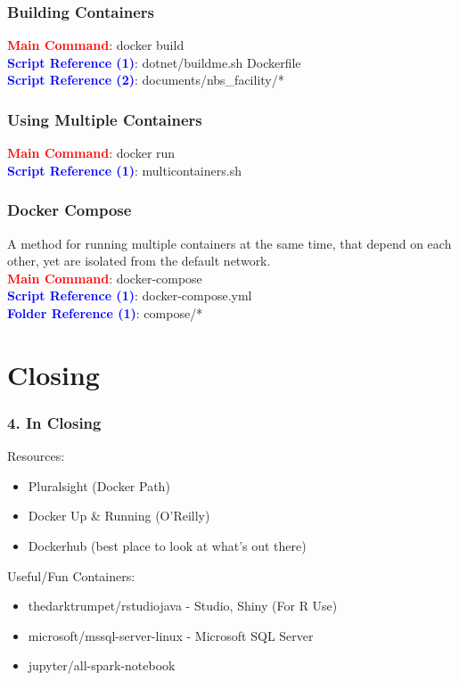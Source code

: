 \documentclass{beamer}
\begin{document}
\begin{frame}
    \frametitle{Building Containers}
    \textcolor{red}{\textbf{Main Command}}: docker build \\
    \textcolor{blue}{\textbf{Script Reference (1)}}: dotnet/buildme.sh Dockerfile \\
    \textcolor{blue}{\textbf{Script Reference (2)}}: documents/nbs\_facility/*
\end{frame}

\begin{frame}
    \frametitle{Using Multiple Containers}
    \textcolor{red}{\textbf{Main Command}}: docker run \\
    \textcolor{blue}{\textbf{Script Reference (1)}}: multicontainers.sh
\end{frame}

\begin{frame}
    \frametitle{Docker Compose}
    A method for running multiple containers at the same time, that depend on each other, yet are isolated from the default network. \\
    \textcolor{red}{\textbf{Main Command}}: docker-compose \\
    \textcolor{blue}{\textbf{Script Reference (1)}}: docker-compose.yml \\
    \textcolor{blue}{\textbf{Folder Reference (1)}}: compose/*
\end{frame}

\section{Closing}
\begin{frame}
    \frametitle{4. In Closing}
    Resources:
    \begin{itemize}
        \item Pluralsight (Docker Path)
        \item Docker Up \& Running (O'Reilly)
        \item Dockerhub (best place to look at what's out there)
    \end{itemize}
    Useful/Fun Containers:
    \begin{itemize}
        \item thedarktrumpet/rstudiojava - Studio, Shiny (For R Use)
        \item microsoft/mssql-server-linux - Microsoft SQL Server
        \item jupyter/all-spark-notebook
    \end{itemize}
\end{frame}
\end{document}
